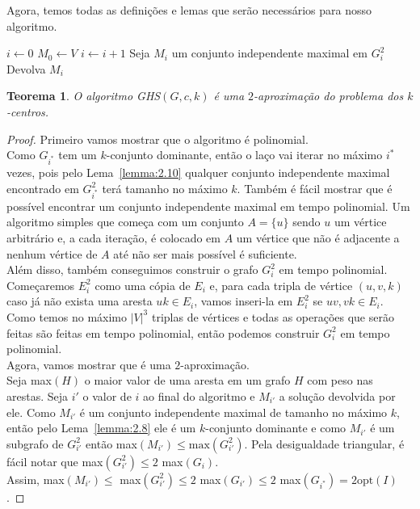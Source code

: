 \documentclass[12pt]{article}
\newcommand{\opt}{\ensuremath{\mathrm{opt}}}
\newtheorem{theorem}{Teorema}[section]
\newcommand{\red}[1]{{\color{red}{#1}}}
\begin{document}
Agora, temos todas as definições e lemas que serão necessários para nosso algoritmo.
\begin{algorithm}
    \begin{algorithmic}[1]
        \State $i \leftarrow 0$
        \State $M_0 \leftarrow V$
            \State $i\leftarrow i + 1$
            \State Seja $M_i$ um conjunto independente maximal em $G_i^2$
        \EndWhile
        \State Devolva $M_i$
        \EndFunction
    \end{algorithmic}
\end{algorithm}

\begin{theorem}
    O algoritmo {\sc GHS}$(G,c,k)$ é uma $2$-aproximação do problema dos $k$-centros.
\end{theorem}
\begin{proof}
    Primeiro vamos mostrar que o algoritmo é polinomial. \\
    Como $G_{i^*}$ tem um $k$-conjunto dominante, então o laço vai iterar no máximo $i^*$ vezes, pois pelo Lema~\ref{lemma:2.10} qualquer conjunto independente maximal encontrado em $G_{i^*}^2$ terá tamanho no máximo $k$.
    Também é fácil mostrar que é possível encontrar um conjunto independente maximal em tempo polinomial. Um algoritmo simples que começa com um conjunto $A = \{u\}$ sendo $u$ um vértice arbitrário e, a cada iteração, é colocado em $A$ um vértice que não é adjacente a nenhum vértice de $A$ até não ser mais possível é suficiente. \red{Faço um lema para explicar melhor?}\\
    Além disso, também conseguimos construir o grafo $G_i^2$ em tempo polinomial. Começaremos $E_i^2$ como uma cópia de $E_i$ e, para cada tripla de vértice $(u,v,k)$ caso já não exista uma aresta $uk \in E_i$, vamos inseri-la em $E_i^2$ se $uv,vk \in E_i$. Como temos no máximo $|V|^3$ triplas de vértices e todas as operações que serão feitas são feitas em tempo polinomial, então podemos construir $G_i^2$ em tempo polinomial. \\
    Agora, vamos mostrar que é uma $2$-aproximação. \\
    Seja max$(H)$ o maior valor de uma aresta em um grafo $H$ com peso nas arestas. Seja $i'$ o valor de $i$ ao final do algoritmo e $M_{i'}$ a solução devolvida por ele. Como $M_{i'}$ é um conjunto independente maximal de tamanho no máximo $k$, então pelo Lema~\ref{lemma:2.8} ele é um $k$-conjunto dominante e como $M_{i'}$ é um subgrafo de $G_{i'}^2$ então max$(M_{i'}) \leq \text{max}(G_{i'}^2) $. Pela desigualdade triangular, é fácil notar que max$(G_{i'}^2) \leq 2$  max$(G_{i})$. \\Assim, max$(M_{i'}) \leq $ max$(G_{i'}^2) \leq 2$ max$(G_{i'}) \leq 2$ max$(G_{i^*})= 2 \opt(I)$. 
\end{proof}
\end{document}
